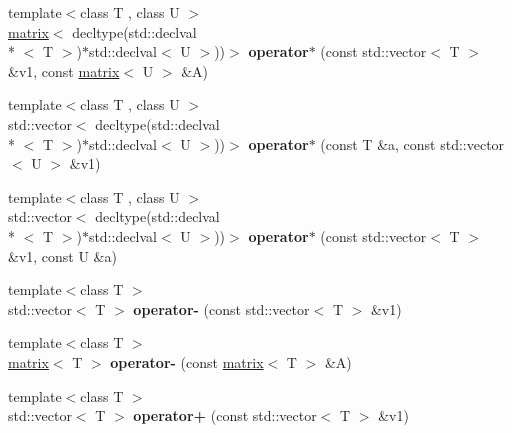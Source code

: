 \begin{DoxyCompactItemize}
\item 
\hypertarget{namespacekeycpp_a6dcf10b0db68d53d126803e8d6d591fb}{{\footnotesize template$<$class T , class U $>$ }\\\hyperlink{classkeycpp_1_1matrix}{matrix}$<$ decltype(std\-::declval\\*
$<$ T $>$)$\ast$std\-::declval$<$ U $>$))$>$ {\bfseries operator$\ast$} (const std\-::vector$<$ T $>$ \&v1, const \hyperlink{classkeycpp_1_1matrix}{matrix}$<$ U $>$ \&A)}\label{namespacekeycpp_a6dcf10b0db68d53d126803e8d6d591fb}

\item 
\hypertarget{namespacekeycpp_a4b523ff3dd5abac240788f6efb2e554e}{{\footnotesize template$<$class T , class U $>$ }\\std\-::vector$<$ decltype(std\-::declval\\*
$<$ T $>$)$\ast$std\-::declval$<$ U $>$))$>$ {\bfseries operator$\ast$} (const T \&a, const std\-::vector$<$ U $>$ \&v1)}\label{namespacekeycpp_a4b523ff3dd5abac240788f6efb2e554e}

\item 
\hypertarget{namespacekeycpp_aa2e9a06b12f7df18005a3daa3c051b2c}{{\footnotesize template$<$class T , class U $>$ }\\std\-::vector$<$ decltype(std\-::declval\\*
$<$ T $>$)$\ast$std\-::declval$<$ U $>$))$>$ {\bfseries operator$\ast$} (const std\-::vector$<$ T $>$ \&v1, const U \&a)}\label{namespacekeycpp_aa2e9a06b12f7df18005a3daa3c051b2c}

\item 
\hypertarget{namespacekeycpp_ac2665554c04ea23aad98e77d1618ca6b}{{\footnotesize template$<$class T $>$ }\\std\-::vector$<$ T $>$ {\bfseries operator-\/} (const std\-::vector$<$ T $>$ \&v1)}\label{namespacekeycpp_ac2665554c04ea23aad98e77d1618ca6b}

\item 
\hypertarget{namespacekeycpp_a390125160a7febd08d5c30629f4f698f}{{\footnotesize template$<$class T $>$ }\\\hyperlink{classkeycpp_1_1matrix}{matrix}$<$ T $>$ {\bfseries operator-\/} (const \hyperlink{classkeycpp_1_1matrix}{matrix}$<$ T $>$ \&A)}\label{namespacekeycpp_a390125160a7febd08d5c30629f4f698f}

\item 
\hypertarget{namespacekeycpp_a7825f94b7be431bab5e5c99f8d7a1b54}{{\footnotesize template$<$class T $>$ }\\std\-::vector$<$ T $>$ {\bfseries operator+} (const std\-::vector$<$ T $>$ \&v1)}\label{namespacekeycpp_a7825f94b7be431bab5e5c99f8d7a1b54}


\end{DoxyCompactItemize}
